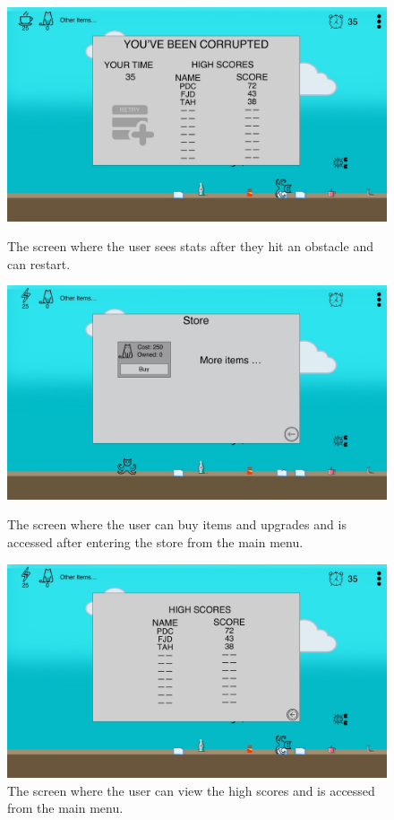 \documentclass[10pt,conference,onecolumn,compsoc]{IEEEtran}
\begin{document}
\begin{figure}[!ht]
\centering
\includegraphics[scale=.2]{MockupEndgame.jpeg}
\caption{The screen where the user sees stats after they hit an obstacle and can restart.}

\includegraphics[scale=.2]{MockupStore.jpeg}
\caption{The screen where the user can buy items and upgrades and is accessed after entering the store from the main menu.}

\includegraphics[scale=.2]{MockupHighscores.jpeg}
\caption{The screen where the user can view the high scores and is accessed from the main menu.}

\end{figure}
\end{document}
